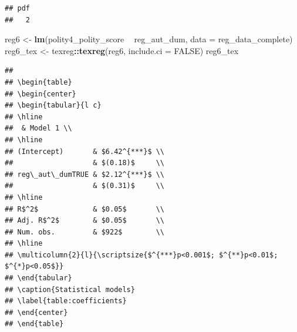 \documentclass[
]{article}
\newenvironment{Shaded}{\begin{snugshade}}{\end{snugshade}}
\newcommand{\DataTypeTok}[1]{\textcolor[rgb]{0.13,0.29,0.53}{#1}}
\newcommand{\KeywordTok}[1]{\textcolor[rgb]{0.13,0.29,0.53}{\textbf{#1}}}
\newcommand{\NormalTok}[1]{#1}
\newcommand{\OperatorTok}[1]{\textcolor[rgb]{0.81,0.36,0.00}{\textbf{#1}}}
\newcommand{\OtherTok}[1]{\textcolor[rgb]{0.56,0.35,0.01}{#1}}
\newcommand{\StringTok}[1]{\textcolor[rgb]{0.31,0.60,0.02}{#1}}
\begin{document}
\begin{verbatim}
## pdf 
##   2
\end{verbatim}

\begin{Shaded}
\begin{Highlighting}[]
\NormalTok{reg6 <-}\StringTok{ }\KeywordTok{lm}\NormalTok{(polity4_polity_score }\OperatorTok{~}\StringTok{ }\NormalTok{reg_aut_dum, }\DataTypeTok{data =}\NormalTok{ reg_data_complete)}
\NormalTok{reg6_tex <-}\StringTok{ }\NormalTok{texreg}\OperatorTok{::}\KeywordTok{texreg}\NormalTok{(reg6, }\DataTypeTok{include.ci =} \OtherTok{FALSE}\NormalTok{)}
\NormalTok{reg6_tex}
\end{Highlighting}
\end{Shaded}

\begin{verbatim}
## 
## \begin{table}
## \begin{center}
## \begin{tabular}{l c}
## \hline
##  & Model 1 \\
## \hline
## (Intercept)       & $6.42^{***}$ \\
##                   & $(0.18)$     \\
## reg\_aut\_dumTRUE & $2.12^{***}$ \\
##                   & $(0.31)$     \\
## \hline
## R$^2$             & $0.05$       \\
## Adj. R$^2$        & $0.05$       \\
## Num. obs.         & $922$        \\
## \hline
## \multicolumn{2}{l}{\scriptsize{$^{***}p<0.001$; $^{**}p<0.01$; $^{*}p<0.05$}}
## \end{tabular}
## \caption{Statistical models}
## \label{table:coefficients}
## \end{center}
## \end{table}
\end{verbatim}

\begin{Shaded}
\end{Shaded}
\end{document}

